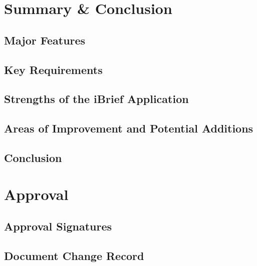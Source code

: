     \chapter{Summary \& Conclusion}\label{ch:Summary & Conclusion}
            
        \section{Major Features}
            
        \section{Key Requirements}
            
        \section{Strengths of the iBrief Application}
            
        \section{Areas of Improvement and Potential Additions}    
            
        \section{Conclusion}
            
            

    \chapter{Approval}
            
        \section{Approval Signatures}
            
        \section{Document Change Record}
            
